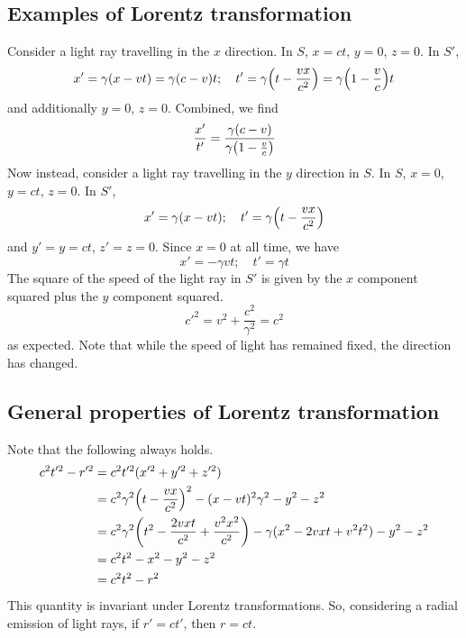 \subsection{Examples of Lorentz transformation}
Consider a light ray travelling in the \(x\) direction.
In \(S\), \(x=ct\), \(y=0\), \(z=0\).
In \(S'\),
\[
	x' = \gamma(x-vt) = \gamma(c-v)t;\quad t' = \gamma\qty(t - \frac{vx}{c^2}) = \gamma\qty(1 - \frac{v}{c})t
\]
and additionally \(y=0\), \(z=0\).
Combined, we find
\[
	\frac{x'}{t'} = \frac{\gamma(c - v)}{\gamma\qty(1 - \frac{v}{c})}
\]
Now instead, consider a light ray travelling in the \(y\) direction in \(S\).
In \(S\), \(x=0\), \(y=ct\), \(z=0\).
In \(S'\),
\[
	x' = \gamma(x-vt);\quad t' = \gamma\qty(t - \frac{vx}{c^2})
\]
and \(y' = y = ct\), \(z' = z = 0\).
Since \(x=0\) at all time, we have
\[
	x' = -\gamma vt;\quad t' = \gamma t
\]
The square of the speed of the light ray in \(S'\) is given by the \(x\) component squared plus the \(y\) component squared.
\[
	c'^2 = v^2 + \frac{c^2}{\gamma^2} = c^2
\]
as expected.
Note that while the speed of light has remained fixed, the direction has changed.

\subsection{General properties of Lorentz transformation}
Note that the following always holds.
\begin{align*}
	c^2 t'^2 - r'^2 & = c^2 t'^2 (x'^2 + y'^2 + z'^2)                                                                            \\
	                & = c^2 \gamma^2 \qty(t - \frac{vx}{c^2})^2 - (x - vt)^2 \gamma^2 - y^2 - z^2                                \\
	                & = c^2 \gamma^2 \qty(t^2 - \frac{2vxt}{c^2} + \frac{v^2x^2}{c^2}) - \gamma(x^2 - 2vxt + v^2t^2) - y^2 - z^2 \\
	                & = c^2 t^2 - x^2 - y^2 - z^2                                                                                \\
	                & = c^2 t^2 - r^2
\end{align*}
This quantity is invariant under Lorentz transformations.
So, considering a radial emission of light rays, if \(r' = ct'\), then \(r = ct\).
